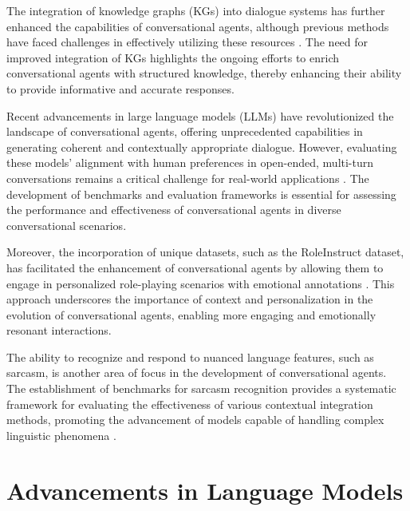 The integration of knowledge graphs (KGs) into dialogue systems has further enhanced the capabilities of conversational agents, although previous methods have faced challenges in effectively utilizing these resources \cite{chaudhuri2021groundingdialoguesystemsknowledge}. The need for improved integration of KGs highlights the ongoing efforts to enrich conversational agents with structured knowledge, thereby enhancing their ability to provide informative and accurate responses.



Recent advancements in large language models (LLMs) have revolutionized the landscape of conversational agents, offering unprecedented capabilities in generating coherent and contextually appropriate dialogue. However, evaluating these models' alignment with human preferences in open-ended, multi-turn conversations remains a critical challenge for real-world applications \cite{JudgingLLM1}. The development of benchmarks and evaluation frameworks is essential for assessing the performance and effectiveness of conversational agents in diverse conversational scenarios.



Moreover, the incorporation of unique datasets, such as the RoleInstruct dataset, has facilitated the enhancement of conversational agents by allowing them to engage in personalized role-playing scenarios with emotional annotations \cite{tao2024rolecraftglmadvancingpersonalizedroleplaying}. This approach underscores the importance of context and personalization in the evolution of conversational agents, enabling more engaging and emotionally resonant interactions.



The ability to recognize and respond to nuanced language features, such as sarcasm, is another area of focus in the development of conversational agents. The establishment of benchmarks for sarcasm recognition provides a systematic framework for evaluating the effectiveness of various contextual integration methods, promoting the advancement of models capable of handling complex linguistic phenomena \cite{nimase2024morecontextshelpsarcasm}.














\section{Advancements in Language Models} \label{sec:Advancements in Language Models}

